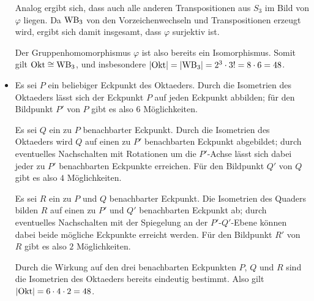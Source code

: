\begin{itemize}
\begin{center}
    \end{center}
    Analog ergibt sich, dass auch alle anderen Transpositionen aus $S_3$ im Bild von $\varphi$ liegen.
    Da $\mathrm{WB}_{3}$ von den Vorzeichenwechseln und Transpositionen erzeugt wird, ergibt sich damit insgesamt, dass $\varphi$ surjektiv ist.
    
    Der Gruppenhomomorphismus $\varphi$ ist also bereits ein Isomorphismus.
    Somit gilt $\mathrm{Okt} \cong\mathrm{WB}_{3}$, und insbesondere $|\mathrm{Okt}| = |\mathrm{WB}_{3}| = 2^3 \cdot 3! = 8 \cdot 6 = 48$.
    
  \item
    Es sei $P$ ein beliebiger Eckpunkt des Oktaeders.
    Durch die Isometrien des Oktaeders lässt sich der Eckpunkt $P$ auf jeden Eckpunkt abbilden;
    für den Bildpunkt $P'$ von $P$ gibt es also $6$ Möglichkeiten.
    
    Es sei $Q$ ein zu $P$ benachbarter Eckpunkt.
    Durch die Isometrien des Oktaeders wird $Q$ auf einen zu $P'$ benachbarten Eckpunkt abgebildet;
    durch eventuelles Nachschalten mit Rotationen um die $P'$-Achse lässt sich dabei jeder zu $P'$ benachbarten Eckpunkte erreichen.
    Für den Bildpunkt $Q'$ von $Q$ gibt es also $4$ Möglichkeiten.
    
    Es sei $R$ ein zu $P$ und $Q$ benachbarter Eckpunkt.
    Die Isometrien des Quaders bilden $R$ auf einen zu $P'$ und $Q'$ benachbarten Eckpunkt ab;
    durch eventuelles Nachschalten mit der Spiegelung an der $P'$-$Q'$-Ebene können dabei beide mögliche Eckpunkte erreicht werden.
    Für den Bildpunkt $R'$ von $R$ gibt es also $2$ Möglichkeiten.
    
    Durch die Wirkung auf den drei benachbarten Eckpunkten $P$, $Q$ und $R$ sind die Isometrien des Oktaeders bereits eindeutig bestimmt.
    Also gilt $|\mathrm{Okt}| = 6 \cdot 4 \cdot 2 = 48$.
\end{itemize}

